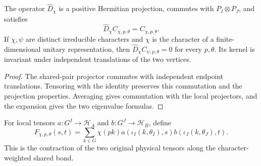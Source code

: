\begin{lemma}
    \label{thm:peps_regular_two_site_charge_detector}
    The operator $\widehat D_\chi$ is a positive Hermitian projection, commutes with
    $P_I\otimes P_J$, and satisfies
    \[
        \widehat D_\chi C_{\chi,p,\theta}=C_{\chi,p,\theta}.
    \]
    If $\chi,\psi$ are distinct irreducible characters and $\chi$ is the character
    of a finite-dimensional unitary representation, then
    $\widehat D_\chi C_{\psi,p,\theta}=0$ for every $p,\theta$.
    Its kernel is invariant under independent translations of the two vertices.
    \leanok
\end{lemma}
\begin{proof}\leanok
    The shared-pair projector commutes with independent endpoint translations.
    Tensoring with the identity preserves this commutation and the projection
    properties. Averaging gives commutation with the local projectors, and the
    expansion gives the two eigenvalue formulas.
\end{proof}

\begin{definition}
    \label{def:peps_regular_two_site_physical_charge_column}
    For local tensors $a:G^I\to\mathcal H_A$ and $b:G^J\to\mathcal H_B$, define
    \[
        F_{\chi,p,\theta}(s,t)=\sum_{k\in G}\chi(pk)
        a(\iota_I(k,\theta_I),s)b(\iota_J(k,\theta_J),t).
    \]
    This is the contraction of the two original physical tensors along the
    character-weighted shared bond.
    \leanok
\end{definition}

